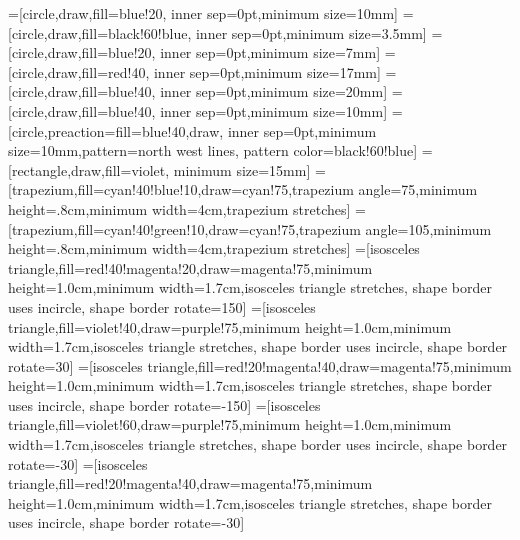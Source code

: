 \documentclass[aps,prb,letterpaper,superscriptaddress,twocolumn,showpacs,floatfix,10pt]{revtex4-1}
\date{\today}
\begin{document}
\newcommand{\op}[1]{\operatorname{#1}}
\newcommand{\cchip}[2]{\chi\nobreak\!=\nobreak\!#1, \,\chi'\nobreak\!=\nobreak\!#2}
\newcommand{\aparam}[2]{a_1\nobreak\!=\nobreak\!#1, \,a_2\nobreak\!=\nobreak\!#2}
\newcommand{\up}{\uparrow}
\newcommand{\down}{\downarrow}
\newcommand{\rev}[1]{{#1}}
\def\bra#1{\langle#1\vert}
\def\ket#1{\vert#1\rangle}
\def\ketbra#1{\vert#1\rangle\langle#1\vert}

\newcommand \entwidth{4cm}
\newcommand \entheight{.8cm}
\newcommand \isovheight{1.0cm}
\newcommand \isovwidth{1.7cm}
\newcommand \isomheight{0.7cm}
\newcommand \isomwidth{2.3cm}
\newcommand \halfheight{.9cm}
=[circle,draw,fill=blue!20, inner sep=0pt,minimum size=10mm]
=[circle,draw,fill=black!60!blue, inner sep=0pt,minimum size=3.5mm]
=[circle,draw,fill=blue!20, inner sep=0pt,minimum size=7mm]
=[circle,draw,fill=red!40, inner sep=0pt,minimum size=17mm]
=[circle,draw,fill=blue!40, inner sep=0pt,minimum size=20mm]
=[circle,draw,fill=blue!40, inner sep=0pt,minimum size=10mm]
=[circle,preaction={fill=blue!40},draw, inner sep=0pt,minimum size=10mm,pattern=north west lines, pattern color=black!60!blue]
=[rectangle,draw,fill=violet, minimum size=15mm]
=[trapezium,fill=cyan!40!blue!10,draw=cyan!75,trapezium angle=75,minimum height=\entheight,minimum width=\entwidth,trapezium stretches]
=[trapezium,fill=cyan!40!green!10,draw=cyan!75,trapezium angle=105,minimum height=\entheight,minimum width=\entwidth,trapezium stretches]
=[isosceles triangle,fill=red!40!magenta!20,draw=magenta!75,minimum height=\isovheight,minimum width=\isovwidth,isosceles triangle stretches, shape border uses incircle, shape border rotate=150]
=[isosceles triangle,fill=violet!40,draw=purple!75,minimum height=\isovheight,minimum width=\isovwidth,isosceles triangle stretches, shape border uses incircle, shape border rotate=30]
=[isosceles triangle,fill=red!20!magenta!40,draw=magenta!75,minimum height=\isovheight,minimum width=\isovwidth,isosceles triangle stretches, shape border uses incircle, shape border rotate=-150]
=[isosceles triangle,fill=violet!60,draw=purple!75,minimum height=\isovheight,minimum width=\isovwidth,isosceles triangle stretches, shape border uses incircle, shape border rotate=-30]
=[isosceles triangle,fill=red!20!magenta!40,draw=magenta!75,minimum height=\isovheight,minimum width=\isovwidth,isosceles triangle stretches, shape border uses incircle, shape border rotate=-30]
\end{document}
